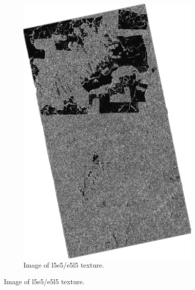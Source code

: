 \begin{figure}[H]
\begin{subfigure}[b]{0.4\linewidth}
    \includegraphics[width=\linewidth]{Chapter4/laws_textures/l5e5_e5l5image.png}
     \caption{Image of l5e5/e5l5 texture.}
  \end{subfigure}
\end{figure}
\newpage
